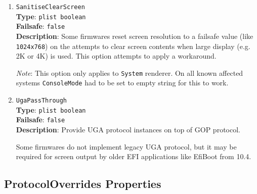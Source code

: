 \documentclass[]{article}
\makeatletter
\renewcommand{\label}[1]{%
\zref@wrapper@immediate{\oldlabel{#1}}}  %
\makeatother
\begin{document}
\begin{enumerate}
\item
  \texttt{SanitiseClearScreen}\\
  \textbf{Type}: \texttt{plist\ boolean}\\
  \textbf{Failsafe}: \texttt{false}\\
  \textbf{Description}: Some firmwares reset screen resolution to a failsafe
  value (like \texttt{1024x768}) on the attempts to clear screen contents
  when large display (e.g. 2K or 4K) is used. This option attempts to apply
  a workaround.

  \emph{Note}: This option only applies to \texttt{System} renderer.
   On all known affected systems \texttt{ConsoleMode} had to be set to
   empty string for this to work.

\item
  \texttt{UgaPassThrough}\\
  \textbf{Type}: \texttt{plist\ boolean}\\
  \textbf{Failsafe}: \texttt{false}\\
  \textbf{Description}: Provide UGA protocol instances on top of GOP protocol.

  Some firmwares do not implement legacy UGA protocol, but it may be required
  for screen output by older EFI applications like EfiBoot from 10.4.

\end{enumerate}


\subsection{ProtocolOverrides Properties}\label{uefiprotoprops}
\end{document}

